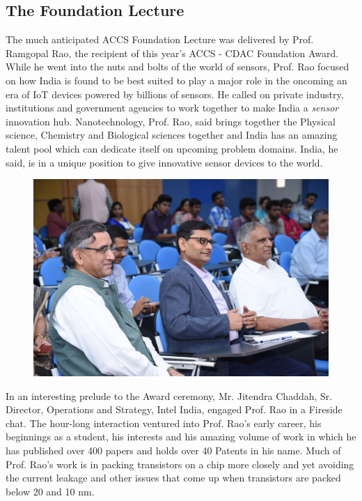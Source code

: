 \begin{multicols}{2}
\subsection*{The Foundation Lecture}

The much anticipated ACCS Foundation Lecture was delivered by Prof. Ramgopal Rao, the recipient of this year’s ACCS - CDAC Foundation Award. While he went into the nuts and bolts of the world of sensors, Prof. Rao focused on how India is found to be best suited to play a major role in the oncoming an era of IoT devices powered by billions of sensors. He called on private industry, institutions and government agencies to work together to make India a \textit{sensor} innovation hub. Nanotechnology, Prof. Rao, said brings together the Physical science, Chemistry and Biological sciences together and India has an amazing talent pool which can dedicate itself on upcoming problem domains. India, he said, is in a unique position to give innovative sensor devices to the world.

\setcounter{figure}{0}
\begin{figure}[H]
\centering
\includegraphics[scale=.75]{src/Figures/events/event-fig02.jpg}
\end{figure}


In an interesting prelude to the Award ceremony, Mr. Jitendra Chaddah, Sr. Director, Operations and Strategy, Intel India, engaged Prof. Rao in a Fireside chat. The hour-long interaction ventured into Prof. Rao’s early career, his beginnings as a student, his interests and his amazing volume of work in which he has published over 400 papers and holds over 40 Patents in his name. Much of Prof. Rao’s work is in packing transistors on a chip more closely and yet avoiding the current leakage and other issues that come up when transistors are packed below 20 and 10 nm.


\end{multicols}
